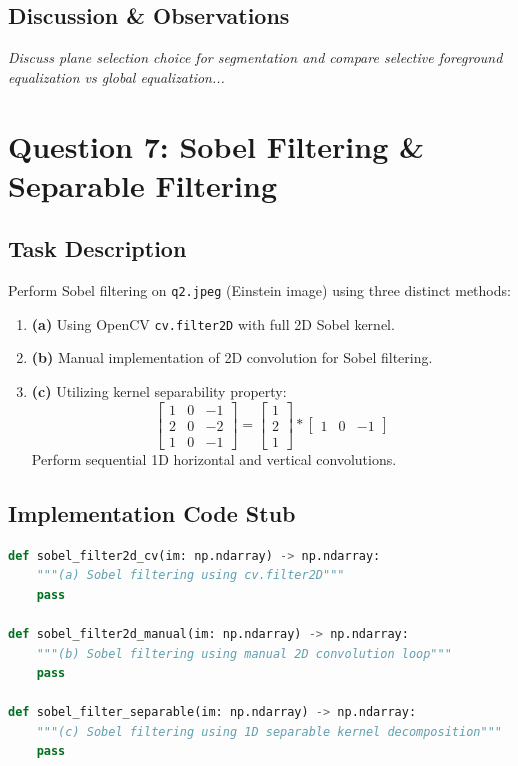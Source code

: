 \documentclass[12pt,a4paper]{article}
\begin{document}
\subsection{Discussion \& Observations}
\textit{Discuss plane selection choice for segmentation and compare selective foreground equalization vs global equalization...}

\newpage

\section{Question 7: Sobel Filtering \& Separable Filtering}

\subsection{Task Description}
Perform Sobel filtering on \texttt{q2.jpeg} (Einstein image) using three distinct methods:
\begin{enumerate}
    \item \textbf{(a)} Using OpenCV \texttt{cv.filter2D} with full 2D Sobel kernel.
    \item \textbf{(b)} Manual implementation of 2D convolution for Sobel filtering.
    \item \textbf{(c)} Utilizing kernel separability property:
    \begin{equation}
    \begin{bmatrix} 1 & 0 & -1 \\ 2 & 0 & -2 \\ 1 & 0 & -1 \end{bmatrix} = \begin{bmatrix} 1 \\ 2 \\ 1 \end{bmatrix} * \begin{bmatrix} 1 & 0 & -1 \end{bmatrix}
    \end{equation}
    Perform sequential 1D horizontal and vertical convolutions.
\end{enumerate}

\subsection{Implementation Code Stub}
\begin{lstlisting}[language=Python, caption={Sobel Filtering Implementations Stub}]
def sobel_filter2d_cv(im: np.ndarray) -> np.ndarray:
    """(a) Sobel filtering using cv.filter2D"""
    pass

def sobel_filter2d_manual(im: np.ndarray) -> np.ndarray:
    """(b) Sobel filtering using manual 2D convolution loop"""
    pass

def sobel_filter_separable(im: np.ndarray) -> np.ndarray:
    """(c) Sobel filtering using 1D separable kernel decomposition"""
    pass
\end{lstlisting}
\end{document}
